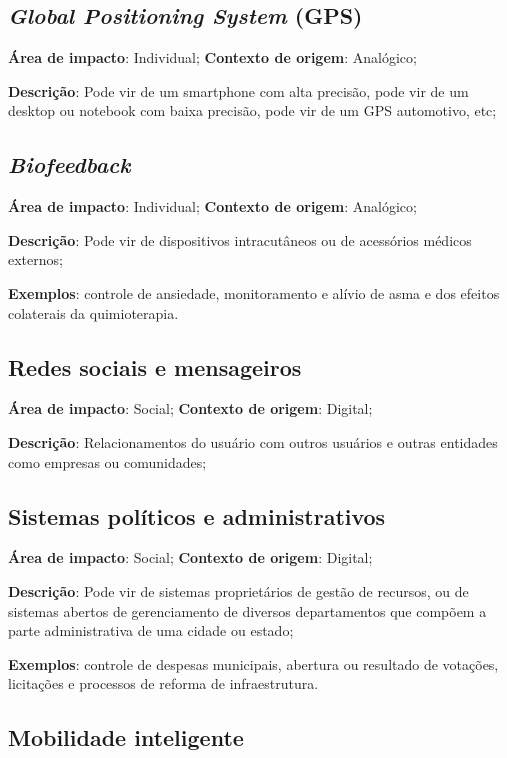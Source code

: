 \subsection{\textit{Global Positioning System} (GPS)}

\textbf{Área de impacto}: Individual; \textbf{Contexto de origem}: Analógico;

\textbf{Descrição}: Pode vir de um smartphone com alta precisão, pode vir de um desktop ou notebook com baixa precisão, pode vir de um GPS automotivo, etc;

\subsection{\textit{Biofeedback}}

\textbf{Área de impacto}: Individual; \textbf{Contexto de origem}: Analógico;

\textbf{Descrição}: Pode vir de dispositivos intracutâneos ou de acessórios médicos externos;

\textbf{Exemplos}: controle de ansiedade, monitoramento e alívio de asma e dos efeitos colaterais da quimioterapia.

\subsection{Redes sociais e mensageiros}

\textbf{Área de impacto}: Social; \textbf{Contexto de origem}: Digital;

\textbf{Descrição}: Relacionamentos do usuário com outros usuários e outras entidades como empresas ou comunidades;

\subsection{Sistemas políticos e administrativos}

\textbf{Área de impacto}: Social; \textbf{Contexto de origem}: Digital;

\textbf{Descrição}: Pode vir de sistemas proprietários de gestão de recursos, ou de sistemas abertos de gerenciamento de diversos departamentos que compõem a parte administrativa de uma cidade ou estado;

\textbf{Exemplos}: controle de despesas municipais, abertura ou resultado de votações, licitações e processos de reforma de infraestrutura.

\subsection{Mobilidade inteligente}

